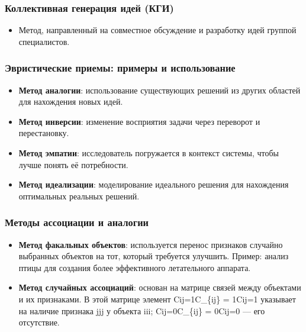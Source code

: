 \documentclass[
]{article}
\providecommand{\tightlist}{%
  \setlength{\itemsep}{0pt}\setlength{\parskip}{0pt}}
\begin{document}
\subsubsection{\texorpdfstring{\textbf{Коллективная генерация идей
(КГИ)}}{Коллективная генерация идей (КГИ)}}\label{ux43aux43eux43bux43bux435ux43aux442ux438ux432ux43dux430ux44f-ux433ux435ux43dux435ux440ux430ux446ux438ux44f-ux438ux434ux435ux439-ux43aux433ux438}

\begin{itemize}
\tightlist
\item
  Метод, направленный на совместное обсуждение и разработку идей группой
  специалистов.
\end{itemize}

\subsubsection{\texorpdfstring{\textbf{Эвристические приемы: примеры и
использование}}{Эвристические приемы: примеры и использование}}\label{ux44dux432ux440ux438ux441ux442ux438ux447ux435ux441ux43aux438ux435-ux43fux440ux438ux435ux43cux44b-ux43fux440ux438ux43cux435ux440ux44b-ux438-ux438ux441ux43fux43eux43bux44cux437ux43eux432ux430ux43dux438ux435}

\begin{itemize}
\tightlist
\item
  \textbf{Метод аналогии}: использование существующих решений из других
  областей для нахождения новых идей.
\item
  \textbf{Метод инверсии}: изменение восприятия задачи через переворот и
  перестановку.
\item
  \textbf{Метод эмпатии}: исследователь погружается в контекст системы,
  чтобы лучше понять её потребности.
\item
  \textbf{Метод идеализации}: моделирование идеального решения для
  нахождения оптимальных реальных решений.
\end{itemize}

\subsubsection{\texorpdfstring{\textbf{Методы ассоциации и
аналогии}}{Методы ассоциации и аналогии}}\label{ux43cux435ux442ux43eux434ux44b-ux430ux441ux441ux43eux446ux438ux430ux446ux438ux438-ux438-ux430ux43dux430ux43bux43eux433ux438ux438}

\begin{itemize}
\tightlist
\item
  \textbf{Метод факальных объектов}: используется перенос признаков
  случайно выбранных объектов на тот, который требуется улучшить.
  Пример: анализ птицы для создания более эффективного летательного
  аппарата.
\item
  \textbf{Метод случайных ассоциаций}: основан на матрице связей между
  объектами и их признаками. В этой матрице элемент Cij=1C\_\{ij\} =
  1Cij\hspace{0pt}=1 указывает на наличие признака jjj у объекта iii;
  Cij=0C\_\{ij\} = 0Cij\hspace{0pt}=0 --- его отсутствие.
\end{itemize}
\end{document}
